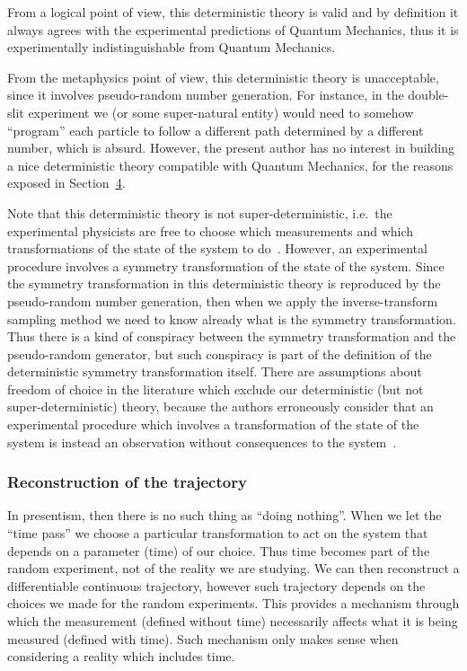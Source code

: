 \documentclass[11pt]{book}
\begin{document}
From a logical point of view, this deterministic theory is valid and by
definition it always agrees with the experimental predictions of Quantum
Mechanics, thus it is experimentally indistinguishable from Quantum
Mechanics.

From the metaphysics point of view, this deterministic theory is
unacceptable, since it involves pseudo-random number generation. For
instance, in the double-slit experiment we (or some super-natural
entity) would need to somehow ``program'' each particle to follow a
different path determined by a different number, which is absurd.
However, the present author has no interest in building a nice
deterministic theory compatible with Quantum Mechanics, for the reasons
exposed in Section~\protect\hyperlink{sec:deterministic}{4}.

Note that this deterministic theory is not super-deterministic, i.e.~the
experimental physicists are free to choose which measurements and which
transformations of the state of the system to
do~\cite{Handsteiner2017Cosmic}\cite{hance2021supermeasured}. However, an experimental procedure
involves a symmetry transformation of the state of the system. Since the
symmetry transformation in this deterministic theory is reproduced by
the pseudo-random number generation, then when we apply the
inverse-transform sampling method we need to know already what is the
symmetry transformation. Thus there is a kind of conspiracy between the
symmetry transformation and the pseudo-random generator, but such
conspiracy is part of the definition of the deterministic symmetry
transformation itself. There are assumptions about freedom of choice in
the literature which exclude our deterministic (but not
super-deterministic) theory, because the authors erroneously consider
that an experimental procedure which involves a transformation of the
state of the system is instead an observation without consequences to
the system~\cite{Handsteiner2017Cosmic}\cite{hance2021supermeasured}.

\hypertarget{reconstruction-of-the-trajectory}{%
\subsubsection{Reconstruction of the
trajectory}\label{reconstruction-of-the-trajectory}}

In presentism, then there is no such thing as ``doing nothing''. When we
let the ``time pass'' we choose a particular transformation to act on
the system that depends on a parameter (time) of our choice. Thus time
becomes part of the random experiment, not of the reality we are
studying. We can then reconstruct a differentiable continuous
trajectory, however such trajectory depends on the choices we made for
the random experiments. This provides a mechanism through which the
measurement (defined without time) necessarily affects what it is being
measured (defined with time). Such mechanism only makes sense when
considering a reality which includes time.
\end{document}

